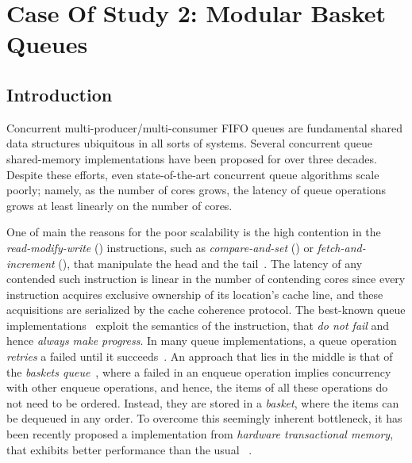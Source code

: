 \chapter{Case Of Study 2: Modular Basket Queues}

\section{Introduction}

Concurrent multi-producer/multi-consumer FIFO queues are fundamental shared data structures ubiquitous in all sorts of systems. Several concurrent queue shared-memory implementations have been proposed for over three decades. Despite these efforts, even state-of-the-art concurrent queue algorithms scale poorly; namely, as the number of cores grows, the latency of queue operations grows at least linearly on the number of cores.

One of main the reasons for the poor scalability is the high contention in the \emph{read-modify-write} (\RMW) instructions, such as \emph{compare-and-set} (\CAS) or \emph{fetch-and-increment} (\FAI), that manipulate the head and the tail~\cite{DBLP_conf_spaa_FatourouK11, DBLP_conf_ppopp_FatourouK12, basketqueue2007, DBLP_conf_ppopp_KoganP11, DBLP_journals_dc_Ladan-MozesS08, DBLP_conf_podc_MichaelS96, DBLP_journals_topc_Milman-SelaKLLP22, ppopp2013x86queues, scalingconcurrent2020, wfq-ppopp16}. The latency of any contended such instruction is linear in the number of contending cores since every instruction acquires exclusive ownership of its location’s cache line, and these acquisitions are serialized by the cache coherence protocol.  The best-known queue implementations~\cite{ppopp2013x86queues, wfq-ppopp16} exploit the semantics of the \FAI instruction, that \emph{do not fail} and hence \emph{always make progress}.  In many queue implementations, a queue operation \emph{retries} a failed \CAS until it succeeds~\cite{DBLP_conf_spaa_FatourouK11, DBLP_conf_ppopp_FatourouK12, DBLP_conf_ppopp_KoganP11, DBLP_journals_dc_Ladan-MozesS08, DBLP_conf_podc_MichaelS96, DBLP_journals_topc_Milman-SelaKLLP22}.  An approach that lies in the middle is that of the \emph{baskets queue}~\cite{basketqueue2007}, where a failed \CAS in an enqueue operation implies concurrency with other enqueue operations, and hence, the items of all these operations do not need to be ordered. Instead, they are stored in a \emph{basket}, where the items can be dequeued in any order.  To overcome this seemingly inherent bottleneck, it has been recently proposed a \CAS implementation from \emph{hardware transactional memory}, that exhibits better performance than the usual \CAS~\cite{scalingconcurrent2020}.

